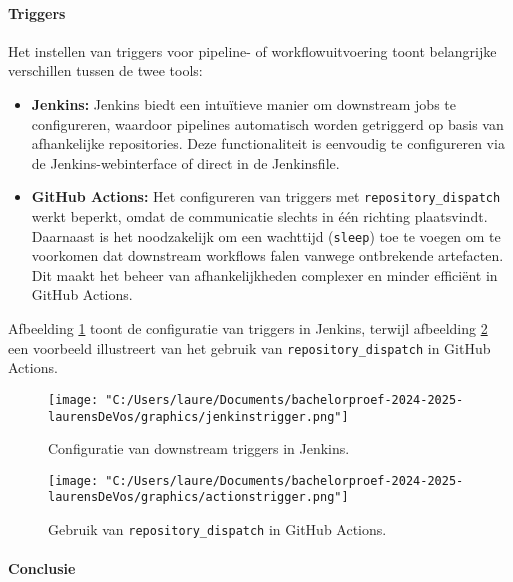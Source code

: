 \paragraph{Triggers}

Het instellen van triggers voor pipeline- of workflowuitvoering toont belangrijke verschillen tussen de twee tools:
\begin{itemize}
    \item \textbf{Jenkins:} Jenkins biedt een intuïtieve manier om downstream jobs te configureren, waardoor pipelines automatisch worden getriggerd op basis van afhankelijke repositories. Deze functionaliteit is eenvoudig te configureren via de Jenkins-webinterface of direct in de Jenkinsfile.
    
    \item \textbf{GitHub Actions:} Het configureren van triggers met \texttt{repository\_dispatch} werkt beperkt, omdat de communicatie slechts in één richting plaatsvindt. Daarnaast is het noodzakelijk om een wachttijd (\texttt{sleep}) toe te voegen om te voorkomen dat downstream workflows falen vanwege ontbrekende artefacten. Dit maakt het beheer van afhankelijkheden complexer en minder efficiënt in GitHub Actions.
\end{itemize}

Afbeelding \ref{fig:jenkins_trigger} toont de configuratie van triggers in Jenkins, terwijl afbeelding \ref{fig:github_dispatch} een voorbeeld illustreert van het gebruik van \texttt{repository\_dispatch} in GitHub Actions.

\begin{figure}[h!]
    \centering
    \texttt{[image: "C:/Users/laure/Documents/bachelorproef-2024-2025-laurensDeVos/graphics/jenkinstrigger.png"]}
    \caption{Configuratie van downstream triggers in Jenkins.}
    \label{fig:jenkins_trigger}
\end{figure}

\begin{figure}[h!]
    \centering
    \texttt{[image: "C:/Users/laure/Documents/bachelorproef-2024-2025-laurensDeVos/graphics/actionstrigger.png"]}
    \caption{Gebruik van \texttt{repository\_dispatch} in GitHub Actions.}
    \label{fig:github_dispatch}
\end{figure}

\paragraph{Conclusie}

